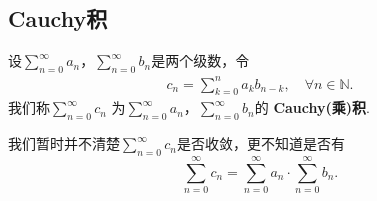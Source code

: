 \documentclass[../../main.tex]{subfiles}%
\begin{document}
\subsection{Cauchy积}

\begin{definition}[Cauchy积]\label{definition:Cauchy积}
设\(\sum_{n = 0}^{\infty} a_n\)，\(\sum_{n = 0}^{\infty} b_n\)是两个级数，令
\begin{align*}
c_n = \sum_{k = 0}^{n} a_k b_{n - k},\quad \forall n\in \mathbb{N}.
\end{align*}
我们称$\sum_{n = 0}^{\infty} c_n$
为\(\sum_{n = 0}^{\infty} a_n\)，\(\sum_{n = 0}^{\infty} b_n\)的 \textbf{Cauchy(乘)积}. 
\end{definition}
\begin{remark}
我们暂时并不清楚\(\sum_{n = 0}^{\infty} c_n\)是否收敛，更不知道是否有
\[
\sum_{n = 0}^{\infty} c_n = \sum_{n = 0}^{\infty} a_n \cdot \sum_{n = 0}^{\infty} b_n. 
\]
\end{remark}
\end{document}
